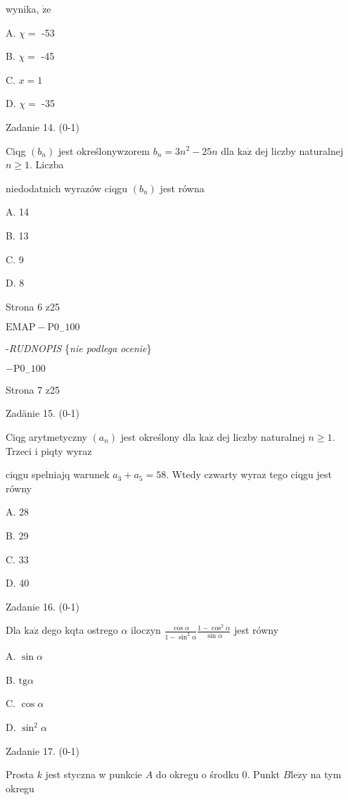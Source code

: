 \documentclass[a4paper,12pt]{article}
\begin{document}
wynika, $\dot{\mathrm{z}}\mathrm{e}$

A. $\chi=$ -53

B. $\chi=$ -45

C. $x=1$

D. $\chi=$ -35

Zadanie 14. (0-1)

Ciqg $(b_{n})$ jest określonywzorem $b_{n}=3n^{2}-25n$ dla $\mathrm{k}\mathrm{a}\dot{\mathrm{z}}$ dej liczby naturalnej $n\geq 1$. Liczba

niedodatnich wyrazów ciqgu $(b_{n})$ jest równa

A. 14

B. 13

C. 9

D. 8

Strona 6 z25

$\mathrm{E}\mathrm{M}\mathrm{A}\mathrm{P}-\mathrm{P}0_{-}100$





-{\it RUDNOPIS} \{{\it nie podlega ocenie}\}

$-\mathrm{P}0_{-}100$

Strona 7 z25





Zadänie 15. (0-1)

Ciqg arytmetyczny $(a_{n})$ jest określony dla $\mathrm{k}\mathrm{a}\dot{\mathrm{z}}$ dej liczby naturalnej $n\geq 1$. Trzeci i piqty wyraz

ciqgu spelniajq warunek $a_{3}+a_{5}=58$. Wtedy czwarty wyraz tego ciqgu jest równy

A. 28

B. 29

C. 33

D. 40

Zadanie 16. (0-1)

Dla $\mathrm{k}\mathrm{a}\dot{\mathrm{z}}$ dego kqta ostrego $\alpha$ iloczyn $\displaystyle \frac{\cos\alpha}{1-\sin^{2}\alpha} \displaystyle \frac{1-\cos^{2}\alpha}{\sin\alpha}$ jest równy

A. $\sin\alpha$

B. $\mathrm{t}\mathrm{g}\alpha$

C. $\cos\alpha$

D. $\sin^{2}\alpha$

Zadanie 17. (0-1)

Prosta $k$ jest styczna w punkcie $A$ do okregu o środku 0. Punkt $B \mathrm{l}\mathrm{e}\dot{\mathrm{z}}\mathrm{y}$ na tym okregu
\end{document}
